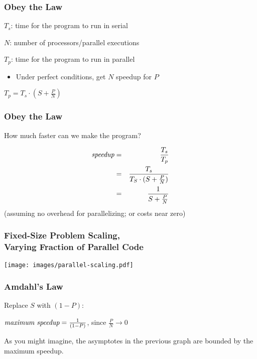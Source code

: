 \begin{frame}
  \frametitle{Obey the Law}

\Large
$T_s$: time for the program to run in serial

$N$: number of processors/parallel executions

$T_p$: time for the program to run in parallel
\vfill
  \begin{itemize}
    \item Under perfect conditions, get $N$ speedup for $P$
  \end{itemize}
\vfill

  \begin{center}
$T_p = T_s \cdot (S + \frac{P}{N})$
  \end{center}
\end{frame}

\begin{frame}
  \frametitle{Obey the Law}

  \hspace*{3em} How much faster can we make the program?

  \begin{eqnarray*}
  \mbox{\em speedup} &=& \frac{T_s}{T_p}\\
                     &=& \frac{T_s}{T_S \cdot (S + \frac{P}{N})}\\
                     &=& \frac{1}{S + \frac{P}{N}}
  \end{eqnarray*}
  \vfill
  \hspace*{3em} (assuming no overhead for parallelizing; or costs near
  zero)

\end{frame}

\begin{frame}
  \frametitle{Fixed-Size Problem Scaling, \\ Varying Fraction of Parallel Code}

  \begin{center}
    \hspace*{2em}\texttt{[image: images/parallel-scaling.pdf]}
  \end{center}
\end{frame}


\begin{frame}
  \frametitle{Amdahl's Law}

 \hspace*{2em}Replace $S$ with $(1 - P)$:

  \begin{center}
  \end{center}
  \vfill
  \begin{center}
    $\mbox{\em maximum speedup} = \frac{1}{(1 - P)}$, since $\frac{P}{N} \rightarrow 0$
  \end{center}

As you might imagine, the asymptotes in the previous graph are bounded by the
  maximum speedup.
\end{frame}

